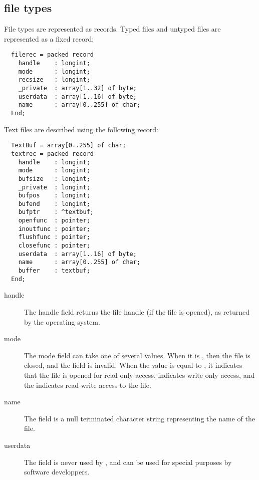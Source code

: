 \subsection{file types}

File types are represented as records. Typed files and untyped
files are represented as a fixed record:

\begin{verbatim}
  filerec = packed record
    handle    : longint;
    mode      : longint;
    recsize   : longint;
    _private  : array[1..32] of byte;
    userdata  : array[1..16] of byte;
    name      : array[0..255] of char;
  End;
\end{verbatim}

Text files are described using the following record:

\begin{verbatim}
  TextBuf = array[0..255] of char;
  textrec = packed record
    handle    : longint;
    mode      : longint;
    bufsize   : longint;
    _private  : longint;
    bufpos    : longint;
    bufend    : longint;
    bufptr    : ^textbuf;
    openfunc  : pointer;
    inoutfunc : pointer;
    flushfunc : pointer;
    closefunc : pointer;
    userdata  : array[1..16] of byte;
    name      : array[0..255] of char;
    buffer    : textbuf;
  End;
\end{verbatim}

\begin{description}
\item[handle] The handle field returns the file handle (if the file is
opened), as returned by the operating system.

\item[mode] The mode field can take one of several values. When it is
, then the file is closed, and the  field is invalid.
When the value is equal to , it indicates that the file is
opened for read only access.  indicates write only access,
and the  indicates read-write access to the file.

\item[name] The  field is a null terminated character string representing
the name of the file.

\item[userdata] The  field is never used by \fpc, and can
be used for special purposes by software developpers.

\end{description}

